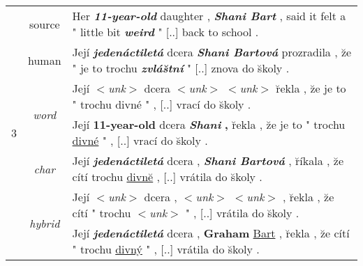 \documentclass[11pt]{article}
\newcommand{\bi}[1]{\textbf{\textit{#1}}}
\newcommand{\source}[1]{\bi{#1}}
\newcommand{\correct}[1]{\bi{\color{blue} #1}}
\newcommand{\wrong}[1]{\textbf{\color{red} #1}}
\newcommand{\close}[1]{\underline{\color{brown} #1}}
\newcommand{\unk}{$<${\it unk}$>$}
\newcommand{\modelword}{{\it (d)}}
\newcommand{\modelchar}{{\it (g)}}
\newcommand{\modelsmall}{{\it (k)}}
\begin{document}
\begin{table*}
{\begin{tabular}{c|c|p{16cm}}
\multirow{7}{*}{3} & source & Her \source{11-year-old} daughter , \source{Shani Bart} , said it felt a " little bit
\source{weird} " [..] back to school . \\ %
& human & Jej\'{i} \correct{jeden\'{a}ctilet\'{a}} dcera \correct{Shani Bartov\'{a}} prozradila
, \u{z}e " je to trochu \correct{zvl\'{a}\u{s}tn\'{i}} " [..] znova do
\u{s}koly . \\ %
  \cline{2-3}
& \multirow{2}{*}{\it{word}} & Jej\'i \unk{} dcera \unk{} \unk{} \u{r}ekla , \u{z}e je to " trochu
divn\'e " , [..] vrac\'i do \u{s}koly .\\ %
&  & Jej\'i \wrong{11-year-old} dcera \correct{Shani} \wrong{,} \u{r}ekla , \u{z}e je to " trochu
\close{divn\'e} " , [..] vrac\'i do \u{s}koly . \\ %
  \cline{2-3}
& \it{char} & Jej\'i \correct{jeden\'actilet\'a} dcera , \correct{Shani
Bartov\'a} , \u{r}\'ikala ,
\u{z}e c\'it\'i trochu \close{divn\u{e}} , [..] vr\'atila do \u{s}koly .\\ %
  \cline{2-3}
& \multirow{2}{*}{\it{hybrid}} & Jej\'i \unk{} dcera , \unk{} \unk{} , \u{r}ekla , \u{z}e c\'it\'i " trochu
\unk{} " , [..] vr\'atila do \u{s}koly .\\ %
&  & Jej\'i \correct{jeden\'actilet\'a} dcera , \wrong{Graham} \close{Bart} , \u{r}ekla , \u{z}e c\'it\'i " trochu
\close{divn\'y} " , [..] vr\'atila do \u{s}koly . \\ %
\end{tabular}
}
\caption{{\bf Sample translations on newstest2015} -- %
for each example, we show the {\it source}, {\it human} translation, and
translations of the following NMT systems: {\it word} model \modelword{},
{\it char} model \modelchar{}, and {\it hybrid} model \modelsmall{}. We show the
translations before replacing \unk{} tokens (if any) for the word-based 
and hybrid models. The following formats are used to highlight
\correct{correct}, \wrong{wrong}, and \close{close} translation segments.}
\label{t:sample}
\end{table*}
\end{document}
